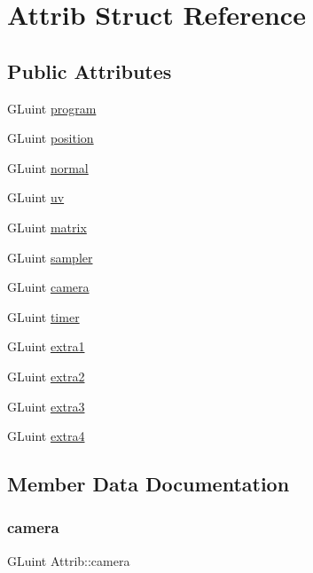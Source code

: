 \hypertarget{structAttrib}{}\section{Attrib Struct Reference}
\label{structAttrib}
\subsection*{Public Attributes}
\begin{DoxyCompactItemize}
\item 
G\+Luint \hyperlink{structAttrib_accbe71d8cd2e04669694902abddf88fd}{program}
\item 
G\+Luint \hyperlink{structAttrib_a2e8900e46275e6dba5de47a6cb3fb014}{position}
\item 
G\+Luint \hyperlink{structAttrib_a1747ed761cce42decf0b1f48e2d424aa}{normal}
\item 
G\+Luint \hyperlink{structAttrib_a91a6c5203f836990dfd2529a4dd128ce}{uv}
\item 
G\+Luint \hyperlink{structAttrib_abf01f51d610dd0ddf14ef44565505dd0}{matrix}
\item 
G\+Luint \hyperlink{structAttrib_ab176427e061e47c040d0a8d25488fd6d}{sampler}
\item 
G\+Luint \hyperlink{structAttrib_a8f4457820b9ba58eeb332bac333c5e55}{camera}
\item 
G\+Luint \hyperlink{structAttrib_aa27da229009adea9e3729e80f7b200b5}{timer}
\item 
G\+Luint \hyperlink{structAttrib_a128a2b0c82df58158709832564ad5ec2}{extra1}
\item 
G\+Luint \hyperlink{structAttrib_a3aeae3bea2c6eda1a2fd8e2387f46dc5}{extra2}
\item 
G\+Luint \hyperlink{structAttrib_a8695ec97ee35d7edda5578eb356ea89c}{extra3}
\item 
G\+Luint \hyperlink{structAttrib_a3cfb70967ab07898959cb0dce7a72ce4}{extra4}
\end{DoxyCompactItemize}


\subsection{Member Data Documentation}
\mbox{\label{structAttrib_a8f4457820b9ba58eeb332bac333c5e55}} 
\subsubsection{\texorpdfstring{camera}{camera}}
{\footnotesize\ttfamily G\+Luint Attrib\+::camera}

